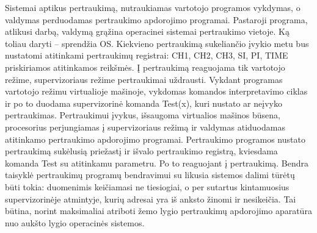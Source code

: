Sistemai aptikus pertraukimą, nutraukiamas vartotojo programos vykdymas, o valdymas perduodamas pertraukimo apdorojimo programai. Pastaroji programa, atlikusi darbą, valdymą grąžina operacinei sistemai pertraukimo vietoje.  Ką toliau daryti – sprendžia OS. Kiekvieno pertraukimą sukeliančio įvykio metu bus nustatomi atitinkami pertraukimų registrai: CH1, CH2, CH3, SI, PI, TIME priskiriamos atitinkamos reikšmės. 
Į pertraukimą reaguojama tik vartotojo režime, supervizoriaus režime pertraukimai uždrausti. Vykdant programas vartotojo režimu virtualioje mašinoje, vykdomas komandos interpretavimo ciklas ir po to duodama supervizorinė komanda Test(x), kuri  nustato ar neįvyko pertraukimas. 
Pertraukimui įvykus, išsaugoma virtualios mašinos būsena, procesorius perjungiamas į supervizoriaus režimą ir valdymas atiduodamas atitinkamo pertraukimo apdorojimo programai.
Pertraukimo programos nustato pertraukimą sukėlusią priežastį ir išvalo pertraukimo registrą, kviesdama komanda Test su atitinkamu parametru. Po  to reaguojant į pertraukimą.
Bendra taisyklė pertraukimų programų bendravimui su likusia sistemos dalimi tūrėtų būti tokia: duomenimis keičiamasi ne tiesiogiai, o per sutartus kintamuosius supervizorinėje atmintyje, kurių adresai yra iš anksto žinomi ir nesikeičia. Tai būtina, norint maksimaliai atriboti žemo lygio pertraukimų apdorojimo aparatūra nuo aukšto lygio operacinės sistemos.
   


